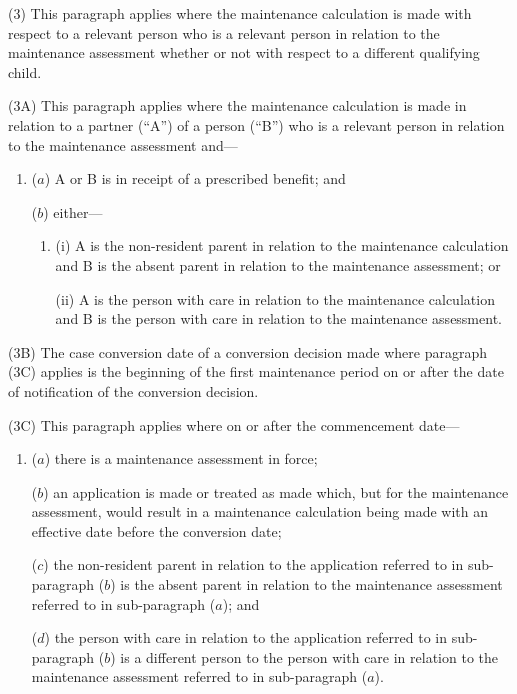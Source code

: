 \documentclass[12pt,a4paper]{article}
\begin{document}
%

(3) This paragraph applies where the maintenance calculation is made with respect to a relevant person who is a relevant person in relation to the maintenance assessment whether or not with respect to a different qualifying child.

(3A) This paragraph applies where the maintenance calculation is made in relation to a partner (“A”) of a person (“B”) who is a relevant person in relation to the maintenance assessment and—
\begin{enumerate}\item[]
($a$) A or B is in receipt of a prescribed benefit; and

($b$) either—
\begin{enumerate}\item[]
(i) A is the non-resident parent in relation to the maintenance calculation and B is the absent parent in relation to the maintenance assessment; or

(ii) A is the person with care in relation to the maintenance calculation and B is the person with care in relation to the maintenance assessment.
\end{enumerate}
\end{enumerate}

(3B) The case conversion date of a conversion decision made where paragraph (3C) applies is the beginning of the first maintenance period on or after the date of notification of the conversion decision.

(3C) This paragraph applies where on or after the commencement date—
\begin{enumerate}\item[]
($a$) there is a maintenance assessment in force;

($b$) an application is made or treated as made which, but for the maintenance assessment, would result in a maintenance calculation being made with an effective date before the conversion date;

($c$) the non-resident parent in relation to the application referred to in sub-paragraph ($b$)  is the absent parent in relation to the maintenance assessment referred to in sub-paragraph ($a$); and

($d$) the person with care in relation to the application referred to in sub-paragraph ($b$)  is a different person to the person with care in relation to the maintenance assessment referred to in sub-paragraph ($a$).
\end{enumerate}
\end{document}

